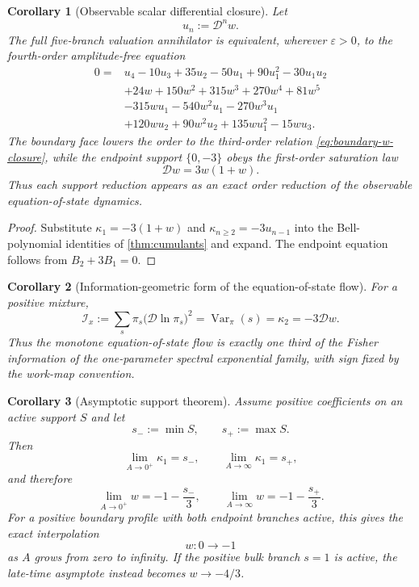 \documentclass[aps,prd,preprint,onecolumn,nofootinbib,superscriptaddress,showkeys]{revtex4-2}
\numberwithin{equation}{section}
\theoremstyle{definition}
\theoremstyle{plain}
\newtheorem{corollary}{Corollary}[section]
\newcommand{\Dil}{\mathscr D}
\begin{document}
\begin{corollary}[Observable scalar differential closure]\label{cor:w-only-closure}
Let
\[
u_n:=\Dil^n w.
\]
The full five-branch valuation annihilator is equivalent, wherever $\varepsilon>0$, to the fourth-order amplitude-free equation
\begin{equation}
\boxed{
\begin{aligned}
0={}&u_4-10u_3+35u_2-50u_1+90u_1^2-30u_1u_2\\
&+24w+150w^2+315w^3+270w^4+81w^5\\
&-315wu_1-540w^2u_1-270w^3u_1\\
&+120wu_2+90w^2u_2+135wu_1^2-15wu_3.
\end{aligned}}
\end{equation}
The boundary face lowers the order to the third-order relation \cref{eq:boundary-w-closure}, while the endpoint support $\{0,-3\}$ obeys the first-order saturation law
\begin{equation}
\boxed{\Dil w=3w(1+w).}
\end{equation}
Thus each support reduction appears as an exact order reduction of the observable equation-of-state dynamics.
\end{corollary}

\begin{proof}
Substitute $\kappa_1=-3(1+w)$ and $\kappa_{n\ge2}=-3u_{n-1}$ into the Bell-polynomial identities of \cref{thm:cumulants} and expand.  The endpoint equation follows from $B_2+3B_1=0$.
\end{proof}

\begin{corollary}[Information-geometric form of the equation-of-state flow]
For a positive mixture,
\begin{equation}
\boxed{
\mathcal I_x
:=\sum_s\pi_s\bigl(\Dil\ln\pi_s\bigr)^2
=\operatorname{Var}_\pi(s)
=\kappa_2
=-3\Dil w.
}
\end{equation}
Thus the monotone equation-of-state flow is exactly one third of the Fisher information of the one-parameter spectral exponential family, with sign fixed by the work-map convention.
\end{corollary}

\begin{corollary}[Asymptotic support theorem]
Assume positive coefficients on an active support $S$ and let
\[
s_-:=\min S,
\qquad
s_+:=\max S.
\]
Then
\begin{equation}
\lim_{A\to0^+}\kappa_1=s_-,
\qquad
\lim_{A\to\infty}\kappa_1=s_+,
\end{equation}
and therefore
\begin{equation}
\lim_{A\to0^+}w=-1-\frac{s_-}{3},
\qquad
\lim_{A\to\infty}w=-1-\frac{s_+}{3}.
\end{equation}
For a positive boundary profile with both endpoint branches active, this gives the exact interpolation
\begin{equation}
w:0\longrightarrow -1
\end{equation}
as $A$ grows from zero to infinity.  If the positive bulk branch $s=1$ is active, the late-time asymptote instead becomes $w\to-4/3$.
\end{corollary}
\end{document}
